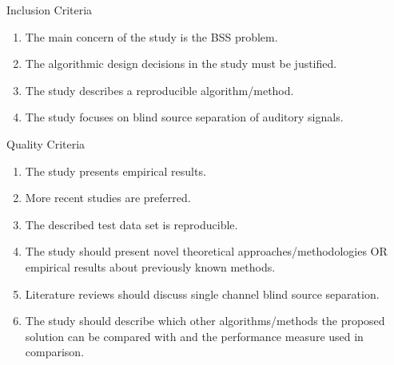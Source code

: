 \begin{description}
	\item Inclusion Criteria
		\begin{enumerate}
			\item The main concern of the study is the BSS
                          problem.
			\item The algorithmic design decisions in the study must be justified.
			\item The study describes a reproducible algorithm/method.
			\item The study focuses on blind source separation of auditory signals.
		\end{enumerate}
	\item Quality Criteria
		\begin{enumerate}
			\item The study presents empirical results.
			\item More recent studies are preferred.
			\item The described test data set is
                          reproducible.
                        \item The study should present novel
                          theoretical approaches/methodologies OR
                          empirical results about previously known methods. 
			\item Literature reviews should discuss single channel blind source separation.
			\item The study should describe which other algorithms/methods the proposed solution can be compared with and the performance measure used in comparison.
		\end{enumerate}
\end{description}
